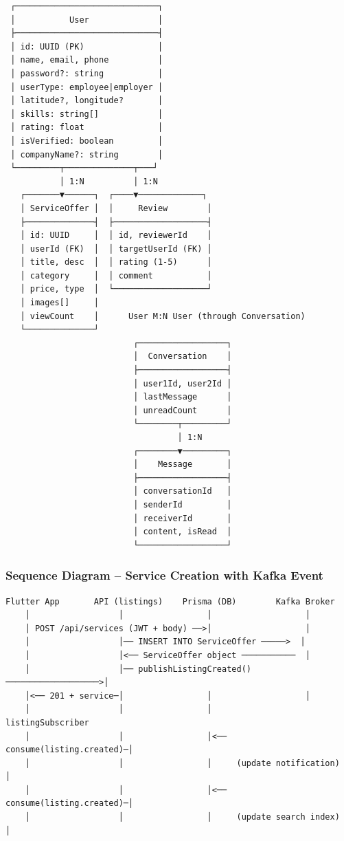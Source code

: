 \documentclass[12pt,a4paper]{report}
\begin{document}
\begin{verbatim}
 ┌─────────────────────────────┐
 │           User              │
 ├─────────────────────────────┤
 │ id: UUID (PK)               │
 │ name, email, phone          │
 │ password?: string           │
 │ userType: employee|employer │
 │ latitude?, longitude?       │
 │ skills: string[]            │
 │ rating: float               │
 │ isVerified: boolean         │
 │ companyName?: string        │
 └─────────┬──────────────┬───┘
           │ 1:N          │ 1:N
   ┌───────▼──────┐  ┌────▼─────────────┐
   │ ServiceOffer │  │     Review        │
   ├──────────────┤  ├───────────────────┤
   │ id: UUID     │  │ id, reviewerId    │
   │ userId (FK)  │  │ targetUserId (FK) │
   │ title, desc  │  │ rating (1-5)      │
   │ category     │  │ comment           │
   │ price, type  │  └───────────────────┘
   │ images[]     │
   │ viewCount    │      User M:N User (through Conversation)
   └──────────────┘
                          ┌──────────────────┐
                          │  Conversation    │
                          ├──────────────────┤
                          │ user1Id, user2Id │
                          │ lastMessage      │
                          │ unreadCount      │
                          └────────┬─────────┘
                                   │ 1:N
                          ┌────────▼─────────┐
                          │    Message       │
                          ├──────────────────┤
                          │ conversationId   │
                          │ senderId         │
                          │ receiverId       │
                          │ content, isRead  │
                          └──────────────────┘
\end{verbatim}

\subsubsection{Sequence Diagram -- Service Creation with Kafka Event}

\begin{verbatim}
Flutter App       API (listings)    Prisma (DB)        Kafka Broker
    │                  │                 │                   │
    │ POST /api/services (JWT + body) ──>│                   │
    │                  │── INSERT INTO ServiceOffer ─────>  │
    │                  │<── ServiceOffer object ───────────  │
    │                  │── publishListingCreated() ───────────────────>│
    │<── 201 + service─│                 │                   │
    │                  │                 │            listingSubscriber
    │                  │                 │<── consume(listing.created)─│
    │                  │                 │     (update notification)   │
    │                  │                 │<── consume(listing.created)─│
    │                  │                 │     (update search index)   │
\end{verbatim}
\end{document}
